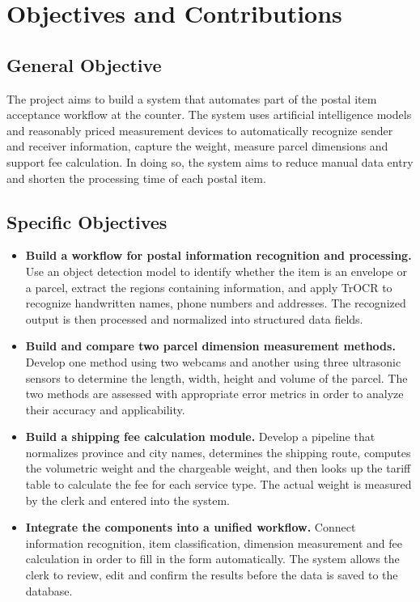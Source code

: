 \section{Objectives and Contributions}

\subsection{General Objective}

The project aims to build a system that automates part of the postal item acceptance workflow at the counter. The system uses artificial intelligence models and reasonably priced measurement devices to automatically recognize sender and receiver information, capture the weight, measure parcel dimensions and support fee calculation. In doing so, the system aims to reduce manual data entry and shorten the processing time of each postal item.

\subsection{Specific Objectives}

\begin{itemize}
    \item \textbf{Build a workflow for postal information recognition and processing.} Use an object detection model to identify whether the item is an envelope or a parcel, extract the regions containing information, and apply TrOCR to recognize handwritten names, phone numbers and addresses. The recognized output is then processed and normalized into structured data fields.

    \item \textbf{Build and compare two parcel dimension measurement methods.} Develop one method using two webcams and another using three ultrasonic sensors to determine the length, width, height and volume of the parcel. The two methods are assessed with appropriate error metrics in order to analyze their accuracy and applicability.

    \item \textbf{Build a shipping fee calculation module.} Develop a pipeline that normalizes province and city names, determines the shipping route, computes the volumetric weight and the chargeable weight, and then looks up the tariff table to calculate the fee for each service type. The actual weight is measured by the clerk and entered into the system.

    \item \textbf{Integrate the components into a unified workflow.} Connect information recognition, item classification, dimension measurement and fee calculation in order to fill in the form automatically. The system allows the clerk to review, edit and confirm the results before the data is saved to the database.
\end{itemize}

